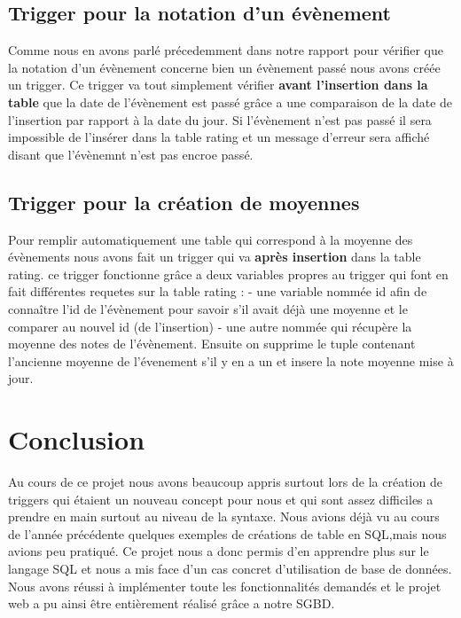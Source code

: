 \documentclass[french]{article}
\begin{document}
        \subsection{Trigger pour la notation d'un évènement}
        Comme nous en avons parlé précedemment dans notre rapport pour vérifier que la notation d'un évènement concerne bien un évènement passé nous avons créée un trigger.
        Ce trigger va tout simplement vérifier \textbf{avant l'insertion dans la table} que la date de l'évènement est passé grâce a une comparaison de la date de l'insertion par rapport à la date du jour.
        Si l'évènement n'est pas passé il sera impossible de l'insérer dans la table rating et un message d'erreur sera affiché disant que l'évènemnt n'est pas encroe passé.
        \subsection{Trigger pour la création de moyennes}
        Pour remplir automatiquement une table qui correspond à la moyenne des évènements nous avons fait un trigger qui va \textbf{après insertion} dans la table rating.
        ce trigger fonctionne grâce a deux variables propres au trigger qui font en fait différentes requetes sur la table rating :
        - une variable nommée id afin de connaître l'id de l'évènement pour savoir s'il avait déjà une moyenne et le comparer au nouvel id (de l'insertion)
        - une autre nommée qui récupère la moyenne des notes de l'évènement.
        Ensuite on supprime le tuple contenant l'ancienne moyenne de l'évenement s'il y en a un et insere la note moyenne mise à jour.
        \newpage
    \section{Conclusion}
    Au cours de ce projet nous avons beaucoup appris surtout lors de la création de triggers qui étaient un nouveau concept pour nous et qui sont assez difficiles a prendre en main surtout au niveau de la syntaxe.
    Nous avions déjà vu au cours de l'année précédente quelques exemples de créations de table en SQL,mais nous avions peu pratiqué.
    Ce projet nous a donc permis d'en apprendre plus sur le langage SQL et nous a mis face d'un cas concret d'utilisation de base de données.
    Nous avons réussi à implémenter toute les fonctionnalités demandés et le projet web a pu ainsi être entièrement réalisé grâce a notre SGBD. 
\end{document}
